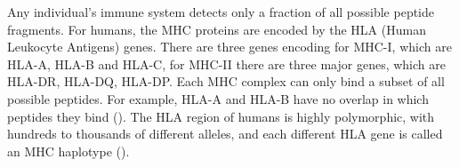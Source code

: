 





Any individual's immune system detects only a fraction of all possible
peptide fragments.
For humans, the MHC proteins are encoded by the
HLA (Human Leukocyte Antigens) genes.
There are three genes encoding for MHC-I, which are HLA-A, HLA-B and HLA-C,
for MHC-II there are three major genes, which are HLA-DR, HLA-DQ, HLA-DP.
Each MHC complex can only bind a subset of all possible peptides.
For example, HLA-A and HLA-B have no overlap in which
peptides they bind (\cite{lund2004definition}).
The HLA region of humans is highly polymorphic, with hundreds 
to thousands of different alleles, 
and each different HLA gene is called 
an MHC haplotype (\cite{marsh2010nomenclature}).

